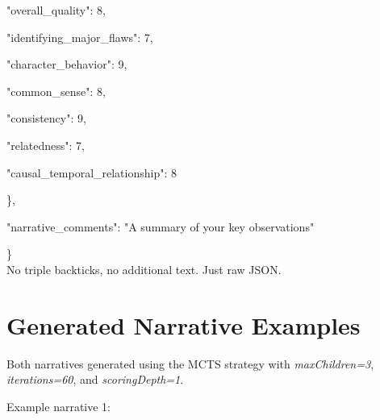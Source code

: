 \documentclass[11pt]{article}
\begin{document}
\begin{small}
\begin{tcolorbox}[colback=gray!10, colframe=gray!40, arc=4mm, boxrule=0pt]
\par\hspace{2em}"overall\_quality": 8,
\par\hspace{2em}"identifying\_major\_flaws": 7,
\par\hspace{2em}"character\_behavior": 9,
\par\hspace{2em}"common\_sense": 8,
\par\hspace{2em}"consistency": 9,
\par\hspace{2em}"relatedness": 7,
\par\hspace{2em}"causal\_temporal\_relationship": 8
\par\hspace{1em}\},
\par\hspace{1em}"narrative\_comments": "A summary of your key observations"
\par\}
\\
No triple backticks, no additional text. Just raw JSON.\\
\end{tcolorbox}
\end{small}

\section{Generated Narrative Examples}
\label{appendix:narrative-examples}

Both narratives generated using the MCTS strategy with \textit{maxChildren=3}, \textit{iterations=60}, and \textit{scoringDepth=1}. 

\bigskip
\noindent
Example narrative 1:
\end{document}
